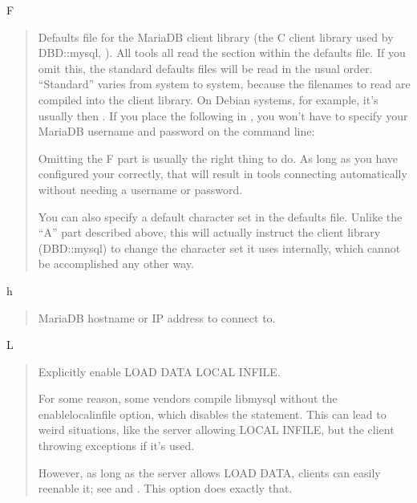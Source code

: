 \documentclass[letterpaper,10pt,english]{sphinxmanual}
\begin{document}
F
\begin{quote}

Defaults file for the MariaDB client library (the C client library used by
DBD::mysql, ).  All tools all read the
\sphinxcode{\sphinxupquote{{[}client{]}}} section within the defaults file.  If you omit this, the standard
defaults files will be read in the usual order.  “Standard” varies from system
to system, because the filenames to read are compiled into the client library.
On Debian systems, for example, it’s usually  then
.  If you place the following in , you won’t have
to specify your MariaDB username and password on the command line:

\begin{sphinxVerbatim}[commandchars=\\\{\}]
\PYG{p}{[}\PYG{p}{]}
\end{sphinxVerbatim}

Omitting the F part is usually the right thing to do.  As long as you have
configured your  correctly, that will result in tools connecting
automatically without needing a username or password.

You can also specify a default character set in the defaults file.  Unlike the
“A” part described above, this will actually instruct the client library
(DBD::mysql) to change the character set it uses internally, which cannot be
accomplished any other way.
\end{quote}

h
\begin{quote}

MariaDB hostname or IP address to connect to.
\end{quote}

L
\begin{quote}

Explicitly enable LOAD DATA LOCAL INFILE.

For some reason, some vendors compile libmysql without the
\textendash{}enable\sphinxhyphen{}local\sphinxhyphen{}infile option, which disables the statement.  This can
lead to weird situations, like the server allowing LOCAL INFILE, but
the client throwing exceptions if it’s used.

However, as long as the server allows LOAD DATA, clients can easily
re\sphinxhyphen{}enable it; see 
and .
This option does exactly that.
\end{quote}
\end{document}
